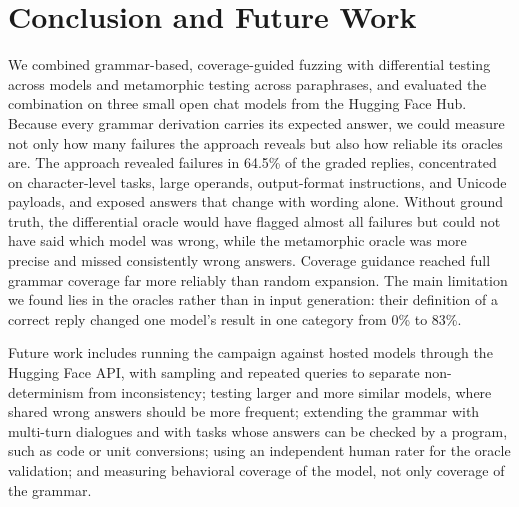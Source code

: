 \section{Conclusion and Future Work}\label{sec:conclusion}

We combined grammar-based, coverage-guided fuzzing with differential testing across models and metamorphic testing across paraphrases, and evaluated the combination on three small open chat models from the Hugging Face Hub. Because every grammar derivation carries its expected answer, we could measure not only how many failures the approach reveals but also how reliable its oracles are. The approach revealed failures in 64.5\% of the graded replies, concentrated on character-level tasks, large operands, output-format instructions, and Unicode payloads, and exposed answers that change with wording alone. Without ground truth, the differential oracle would have flagged almost all failures but could not have said which model was wrong, while the metamorphic oracle was more precise and missed consistently wrong answers. Coverage guidance reached full grammar coverage far more reliably than random expansion. The main limitation we found lies in the oracles rather than in input generation: their definition of a correct reply changed one model's result in one category from 0\% to 83\%.

Future work includes running the campaign against hosted models through the Hugging Face API, with sampling and repeated queries to separate non-determinism from inconsistency; testing larger and more similar models, where shared wrong answers should be more frequent; extending the grammar with multi-turn dialogues and with tasks whose answers can be checked by a program, such as code or unit conversions; using an independent human rater for the oracle validation; and measuring behavioral coverage of the model, not only coverage of the grammar.
